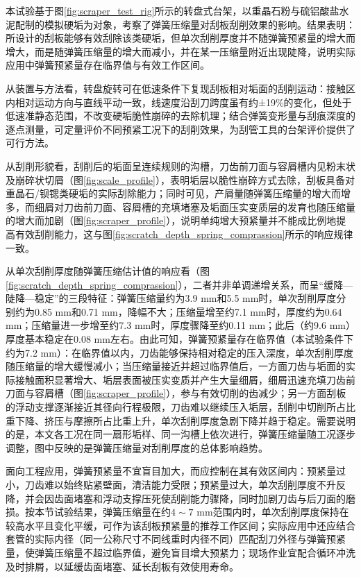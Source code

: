 本试验基于图\ref{fig:scraper_test_rig}所示的转盘式台架，以重晶石粉与硫铝酸盐水泥配制的模拟硬垢为对象，考察了弹簧压缩量对刮板刮削效果的影响。结果表明：所设计的刮板能够有效刮除该类硬垢，但单次刮削厚度并不随弹簧预紧量的增大而增大，而是随弹簧压缩量的增大而减小，并在某一压缩量附近出现陡降，说明实际应用中弹簧预紧量存在临界值与有效工作区间。

从装置与方法看，转盘旋转可在低速条件下复现刮板相对垢面的刮削运动：接触区内相对运动方向与直线平动一致，线速度沿刮刀跨度虽有约±19\%的变化，但处于低速准静态范围，不改变硬垢脆性崩碎的去除机理；结合弹簧变形量与刮痕深度的逐点测量，可定量评价不同预紧工况下的刮削效果，为刮管工具的台架评价提供了可行方法。

从刮削形貌看，刮削后的垢面呈连续规则的沟槽，刀齿前刀面与容屑槽内见粉末状及崩碎状切屑（图\ref{fig:scale_profile}），表明垢层以脆性崩碎方式去除，刮板具备对重晶石/钡锶类硬垢的实际刮除能力；同时可见，产屑量随弹簧压缩量的增大而增多，而细屑对刀齿前刀面、容屑槽的充填堵塞及垢面压实变质层的发育也随压缩量的增大而加剧（图\ref{fig:scraper_profile}），说明单纯增大预紧量并不能成比例地提高有效刮削能力，这与图\ref{fig:scratch_depth_spring_comprassion}所示的响应规律一致。

从单次刮削厚度随弹簧压缩估计值的响应看（图\ref{fig:scratch_depth_spring_comprassion}），二者并非单调递增关系，而呈“缓降—陡降—稳定”的三段特征：弹簧压缩量约为3.9 mm和5.5 mm时，单次刮削厚度分别约为0.85 mm和0.71 mm，降幅不大；压缩量增至约7.1 mm时，厚度约为0.64 mm；压缩量进一步增至约7.3 mm时，厚度骤降至约0.11 mm；此后（约9.6 mm）厚度基本稳定在0.08 mm左右。由此可知，弹簧预紧量存在临界值（本试验条件下约为7.2 mm）：在临界值以内，刀齿能够保持相对稳定的压入深度，单次刮削厚度随压缩量的增大缓慢减小；当压缩量接近并超过临界值后，一方面刀齿与垢面的实际接触面积显著增大、垢层表面被压实变质并产生大量细屑，细屑迅速充填刀齿前刀面与容屑槽（图\ref{fig:scraper_profile}），参与有效切削的齿减少；另一方面刮板的浮动支撑逐渐接近其径向行程极限，刀齿难以继续压入垢层，刮削中切削所占比重下降、挤压与摩擦所占比重上升，单次刮削厚度急剧下降并趋于稳定。需要说明的是，本文各工况在同一扇形垢样、同一沟槽上依次进行，弹簧压缩量随工况逐步调整，图中反映的是弹簧压缩量对刮削厚度的总体影响趋势。

面向工程应用，弹簧预紧量不宜盲目加大，而应控制在其有效区间内：预紧量过小，刀齿难以始终贴紧壁面，清洁能力受限；预紧量过大，单次刮削厚度不升反降，并会因齿面堵塞和浮动支撑压死使刮削能力骤降，同时加剧刀齿与后刀面的磨损。按本节试验结果，弹簧压缩量在约$4\sim7$ mm范围内时，单次刮削厚度保持在较高水平且变化平缓，可作为该刮板预紧量的推荐工作区间；实际应用中还应结合套管的实际内径（同一公称尺寸不同线重时内径不同）匹配刮刀外径与弹簧预紧量，使弹簧压缩量不超过临界值，避免盲目增大预紧力；现场作业宜配合循环冲洗及时排屑，以延缓齿面堵塞、延长刮板有效使用寿命。

